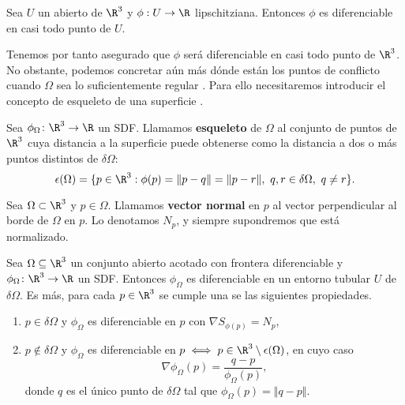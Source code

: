 \begin{lema}
    Sea $U$ un abierto de $\R^3$ y $\phi:U\to \R$ lipschitziana. Entonces $\phi$ es diferenciable en casi todo punto de $U$.
\end{lema}

Tenemos por tanto asegurado que $\phi$ será diferenciable en casi todo punto de $\R^3$. No obstante, podemos concretar aún más dónde están los puntos de conflicto cuando $\Omega$ sea lo suficientemente regular \cite{dif1} \cite{dif2}. Para ello necesitaremos introducir el concepto de esqueleto de una superficie \cite{derivWiki}.
\begin{definicion}
    Sea $\phi_{\Omega} \colon \R^3\to \R$ un SDF. Llamamos \textbf{esqueleto} de $\Omega$ al conjunto de puntos de $\R^3$ cuya distancia a la superficie puede obtenerse como la distancia a dos o más puntos distintos de $\delta \Omega$:
    \begin{equation}
        \epsilon(\Omega) = \{p\in \R^3 : \phi(p) = \Vert p-q\Vert = \Vert p-r\Vert,\ q,r\in \delta\Omega ,\ q\neq r \}.
    \end{equation}
\end{definicion}

\begin{definicion}
    Sea $\Omega \subset \R^3$ y $p\in \Omega$. Llamamos \textbf{vector normal} en $p$ al vector perpendicular al borde de $\Omega$ en $p$. Lo denotamos $N_p$, y siempre supondremos que está normalizado.
\end{definicion}

\begin{teorema}\label{teo:diff}
    Sea $\Omega \subseteq \R^3$ un conjunto abierto acotado con frontera diferenciable y $\phi_{\Omega} \colon \R^3\to \R$ un SDF. Entonces $\phi_{\Omega}$ es diferenciable en un entorno tubular $U$ de $\delta \Omega$. Es más, para cada $p\in \R^3$ se cumple una se las siguientes propiedades.
    \begin{enumerate}
        \item $p\in \delta \Omega$ y $\phi_{\Omega}$ es diferenciable en $p$ con $\nabla S_{\phi(p)} = N_p$,
        \item $p\notin \delta \Omega$ y $\phi_{\Omega}$ es diferenciable en $p \iff p\in \R^3\setminus \epsilon(\Omega)$, en cuyo caso
        \begin{equation*}
            \nabla \phi_{\Omega}(p) = \frac{q-p}{\phi_{\Omega}(p)},
        \end{equation*}
        donde $q$ es el único punto de $\delta\Omega$ tal que $\phi_{\Omega}(p) = \Vert q-p\Vert$.
    \end{enumerate}
\end{teorema}

